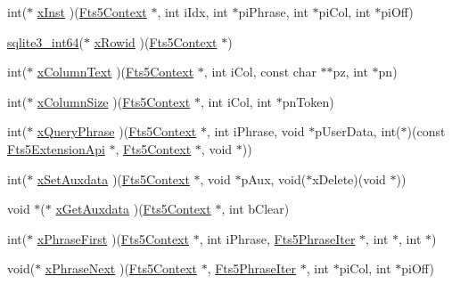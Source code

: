 \begin{DoxyCompactItemize}
int($\ast$ \hyperlink{struct_fts5_extension_api_a85e17f20db782b20b503f1d803a47a9e}{x\+Inst} )(\hyperlink{sqlite3_8h_a97821b95ebebd43db901977ffd5b26bc}{Fts5\+Context} $\ast$, int i\+Idx, int $\ast$pi\+Phrase, int $\ast$pi\+Col, int $\ast$pi\+Off)
\item 
\hyperlink{sqlite3_8h_a0a4d3e6c1ad46f90e746b920ab6ca0d2}{sqlite3\+\_\+int64}($\ast$ \hyperlink{struct_fts5_extension_api_acc4336c9f7bf39defa1acbdbf5df0020}{x\+Rowid} )(\hyperlink{sqlite3_8h_a97821b95ebebd43db901977ffd5b26bc}{Fts5\+Context} $\ast$)
\item 
int($\ast$ \hyperlink{struct_fts5_extension_api_a03c7fcd31a751fc34d25e5288045f91d}{x\+Column\+Text} )(\hyperlink{sqlite3_8h_a97821b95ebebd43db901977ffd5b26bc}{Fts5\+Context} $\ast$, int i\+Col, const char $\ast$$\ast$pz, int $\ast$pn)
\item 
int($\ast$ \hyperlink{struct_fts5_extension_api_aefe6eb4685546e58f056a61da39a2bcb}{x\+Column\+Size} )(\hyperlink{sqlite3_8h_a97821b95ebebd43db901977ffd5b26bc}{Fts5\+Context} $\ast$, int i\+Col, int $\ast$pn\+Token)
\item 
int($\ast$ \hyperlink{struct_fts5_extension_api_a8f6dcf0a1d246b235f98f5bbb214e28d}{x\+Query\+Phrase} )(\hyperlink{sqlite3_8h_a97821b95ebebd43db901977ffd5b26bc}{Fts5\+Context} $\ast$, int i\+Phrase, void $\ast$p\+User\+Data, int($\ast$)(const \hyperlink{struct_fts5_extension_api}{Fts5\+Extension\+Api} $\ast$, \hyperlink{sqlite3_8h_a97821b95ebebd43db901977ffd5b26bc}{Fts5\+Context} $\ast$, void $\ast$))
\item 
int($\ast$ \hyperlink{struct_fts5_extension_api_a0f59a6c383a478ed95efdb7e4a95de80}{x\+Set\+Auxdata} )(\hyperlink{sqlite3_8h_a97821b95ebebd43db901977ffd5b26bc}{Fts5\+Context} $\ast$, void $\ast$p\+Aux, void($\ast$x\+Delete)(void $\ast$))
\item 
void $\ast$($\ast$ \hyperlink{struct_fts5_extension_api_a63ba9aaf30fe9fe5fbcd1541ff38abff}{x\+Get\+Auxdata} )(\hyperlink{sqlite3_8h_a97821b95ebebd43db901977ffd5b26bc}{Fts5\+Context} $\ast$, int b\+Clear)
\item 
int($\ast$ \hyperlink{struct_fts5_extension_api_ae2584a3afa2a70504847600e609d43ad}{x\+Phrase\+First} )(\hyperlink{sqlite3_8h_a97821b95ebebd43db901977ffd5b26bc}{Fts5\+Context} $\ast$, int i\+Phrase, \hyperlink{struct_fts5_phrase_iter}{Fts5\+Phrase\+Iter} $\ast$, int $\ast$, int $\ast$)
\item 
void($\ast$ \hyperlink{struct_fts5_extension_api_ac46faf7ccccf6a02454069b296dc1877}{x\+Phrase\+Next} )(\hyperlink{sqlite3_8h_a97821b95ebebd43db901977ffd5b26bc}{Fts5\+Context} $\ast$, \hyperlink{struct_fts5_phrase_iter}{Fts5\+Phrase\+Iter} $\ast$, int $\ast$pi\+Col, int $\ast$pi\+Off)
$$
\end{DoxyCompactItemize}
